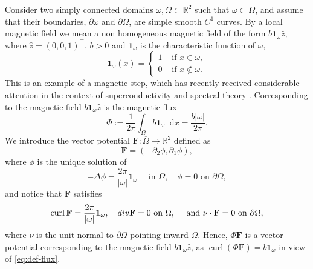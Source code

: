\documentclass[11pt]{amsart}
\DeclareMathOperator{\curl}{curl}
\newcommand{\R}{\mathbb R}
\newcommand{\Fb}{\mathbf F}
\newcommand{\dd}{\mathop{}\!{\mathrm d}}
\theoremstyle{definition}
\numberwithin{equation}{section}
\begin{document}
Consider two simply connected domains \(\omega,\Omega\subset\R^2\) such that \(\overline{\omega}\subset\Omega\), and assume that their boundaries, \(\partial\omega\) and \(\partial\Omega\),  are simple smooth \(C^1\) curves.
%
By a local magnetic field we mean a non homogeneous magnetic field of the form $b\mathbf 1_\omega\hat z$, where $\hat z=(0,0,1)^\top$, $b>0$ and $\mathbf 1_\omega$ is the characteristic function of $\omega$,
\begin{equation}\label{eq:def-B}
\mathbf 1_\omega(x)=\begin{cases}1&\text{ if }x\in\omega,\\
0&\text{ if }x\not\in\omega.
\end{cases}
\end{equation}
This is an example of a magnetic step, which has recently received considerable attention in the context of superconductivity and spectral theory \cite{AG, AHK, AKPS, G2}.
%
Corresponding to the magnetic field $b\mathbf 1_\omega\hat z$ is the magnetic flux
\begin{equation}\label{eq:def-flux}
\Phi:=\frac1{2\pi}\int_{\Omega}b\mathbf 1_\omega\dd x=\frac{b|\omega|}{2\pi}.
\end{equation}
We introduce the vector potential \(\Fb:\overline{\Omega}\to\mathbb R^2\) defined as
\begin{equation}\label{eq:def-F}
\Fb=(-\partial_2\phi,\partial_1\phi),
\end{equation}
where \(\phi\) is the unique solution of
\[ -\Delta\phi=\frac{2\pi}{|\omega|}\mathbf 1_\omega\quad\text{ in } \Omega,\quad \phi=0\text{ on }\partial\Omega,\]
and notice that  \(\Fb\) satisfies
\begin{equation}\label{eq:prop-A}
\curl\Fb=\frac{2\pi}{|\omega|}\mathbf 1_\omega,\quad  {\rm div}\Fb=0\text{ on }\Omega,\quad\text{ and } \nu\cdot\Fb=0\text{ on }\partial\Omega,
\end{equation}
where \(\nu\) is the unit normal to \(\partial\Omega\) pointing inward \(\Omega\). Hence, $\Phi\Fb$ is a vector potential corresponding to the magnetic field $b\mathbf 1_\omega\hat z$, as $\curl(\Phi\Fb)=b\mathbf 1_\omega$ in view of \eqref{eq:def-flux}.\medskip
%
\end{document}
